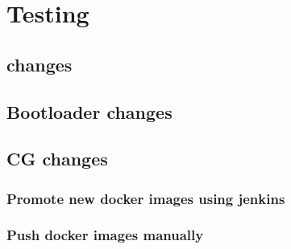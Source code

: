 \chapter{\pod{} Testing}\label{p03:ch02:pod_testing}
	\section{\axceleratepod{} changes}
	\section{Bootloader changes}
	\section{CG changes}
		\subsection{Promote new docker images using jenkins}
		\subsection{Push docker images manually}